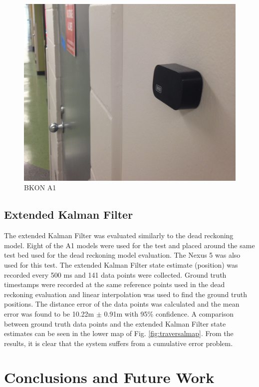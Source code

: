\documentclass[conference]{IEEEtran}
\begin{document}
\begin{figure}[h]
\centering
\includegraphics[scale=0.2]{BKON.jpg}
\caption{BKON A1}
\captionsetup{justification=centering,margin=2cm}
\label{fig:bkon}
\end{figure}

\subsection{Extended Kalman Filter}

The extended Kalman Filter was evaluated similarly to the dead reckoning model. Eight of the A1 models were used for the test and placed around the same test bed used for the dead reckoning model evaluation. The Nexus 5 was also used for this test. The extended Kalman Filter state estimate (position) was recorded every 500 ms and 141 data points were collected. Ground truth timestamps were recorded at the same reference points used in the dead reckoning evaluation and linear interpolation was used to find the ground truth positions. The distance error of the data points was calculated and the mean error was found to be 10.22m $\pm$ 0.91m with 95\% confidence. A comparison between ground truth data points and the extended Kalman Filter state estimates can be seen in the lower map of Fig. \ref{fig:traversalmap}. From the results, it is clear that the system suffers from a cumulative error problem.


\section{Conclusions and Future Work}
\end{document}
